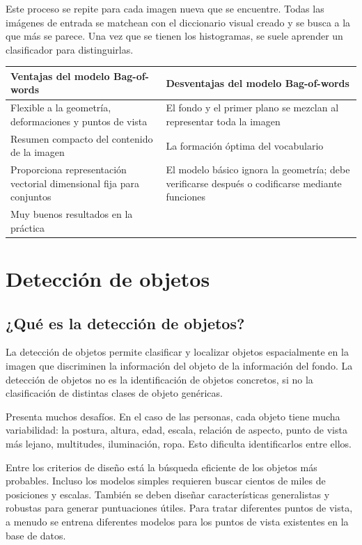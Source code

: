 Este proceso se repite para cada imagen nueva que se encuentre. Todas las imágenes de entrada se matchean con el diccionario visual creado y se busca a la que más se parece. Una vez que se tienen los histogramas, se suele aprender un clasificador para distinguirlas.

\begin{table}[h]
\centering
\begin{tabular}{p{6.5cm}|p{6.5cm}}
Ventajas del modelo Bag-of-words & Desventajas del modelo Bag-of-words \\ \hline
Flexible a la geometría, deformaciones y puntos de vista & El fondo y el primer plano se mezclan al representar toda la imagen \\
Resumen compacto del contenido de la imagen & La formación óptima del vocabulario \\
Proporciona representación vectorial dimensional fija para conjuntos & El modelo básico ignora la geometría; debe verificarse después o codificarse mediante funciones \\
Muy buenos resultados en la práctica & 
\end{tabular}
\end{table}

\section{Detección de objetos}
\subsection{¿Qué es la detección de objetos?}
La detección de objetos permite clasificar y localizar objetos espacialmente en la imagen que discriminen la información del objeto de la información del fondo. La detección de objetos no es la identificación de objetos concretos, si no la clasificación de distintas clases de objeto genéricas.

Presenta muchos desafíos. En el caso de las personas, cada objeto tiene mucha variabilidad: la postura, altura, edad, escala, relación de aspecto, punto de vista más lejano, multitudes, iluminación, ropa. Esto dificulta identificarlos entre ellos.

Entre los criterios de diseño está la búsqueda eficiente de los objetos más probables. Incluso los modelos simples requieren buscar cientos de miles de posiciones y escalas. También se deben diseñar características generalistas y robustas para generar puntuaciones útiles. Para tratar diferentes puntos de vista, a menudo se entrena diferentes modelos para los puntos de vista existentes en la base de datos.

